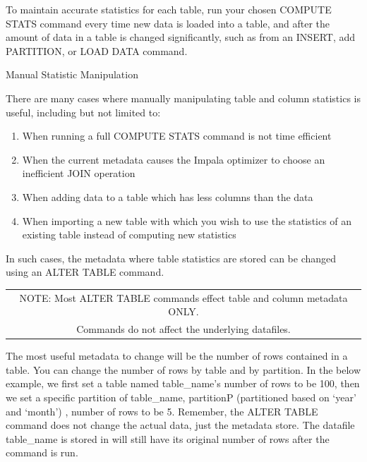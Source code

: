 \documentclass[onecolumn, draftclsnofoot,10pt, compsoc]{IEEEtran}
\begin{document}
To maintain accurate statistics for each table, run your chosen COMPUTE STATS command every time new data is loaded into a table, and after the amount of data in a table is changed significantly, such as from an INSERT, add PARTITION, or LOAD DATA command. 
\newline
\newline

Manual Statistic Manipulation

There are many cases where manually manipulating table and column statistics is useful, including but not limited to:
\begin{enumerate}
    \item When running a full COMPUTE STATS command is not time efficient
    \item When the current metadata causes the Impala optimizer to choose an inefficient JOIN operation
    \item When adding data to a table which has less columns than the data 
    \item When importing a new table with which you wish to use the statistics of an existing table instead of computing new statistics
\end{enumerate}

In such cases, the metadata where table statistics are stored can be changed using an ALTER TABLE command. 

\begin{center}
\begin{tabular}{ |c| }
    \hline
    NOTE: Most ALTER TABLE commands effect table and column metadata ONLY. \\
    Commands do not affect the underlying datafiles. \\
    \hline
\end{tabular}
\end{center}

The most useful metadata to change will be the number of rows contained in a table. You can change the number of rows by table and by partition.
In the below example, we first set a table named table\_name’s number of rows to be 100, then we set a specific partition of table\_name, partitionP (partitioned based on ‘year’ and ‘month’) , number of rows to be 5. 
Remember, the ALTER TABLE command does not change the actual data,  just the metadata store. 
The datafile table\_name is stored in will still have its original number of rows after the command is run.
\end{document}
